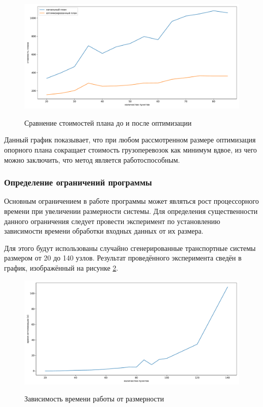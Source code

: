 \begin{figure}[h!]
	\begin{center}
		{\includegraphics[scale=0.5, angle=0, page=1]{research/cmp.pdf}}
		\caption{Сравнение стоимостей плана до и после оптимизации}
		\label{exp:cmp}
	\end{center}
\end{figure}

Данный график показывает, что при любом рассмотренном размере оптимизация опорного плана сокращает стоимость грузоперевозок как минимум вдвое, из чего можно заключить, что метод является работоспособным.

\subsubsection{Определение ограничений программы}
Основным ограничением в работе программы может являться рост процессорного времени при увеличении размерности системы. Для определения существенности данного ограничения следует провести эксперимент по установлению зависимости времени обработки входных данных от их размера.

Для этого будут использованы случайно сгенерированные транспортные системы размером от 20 до 140 узлов. Результат проведённого эксперимента сведён в график, изображённый на рисунке \ref{exp:timing}.

\begin{figure}[h!]
	\begin{center}
		{\includegraphics[scale=0.5, angle=0, page=1]{research/timing.pdf}}
		\caption{Зависимость времени работы от размерности}
		\label{exp:timing}
	\end{center}
\end{figure}

